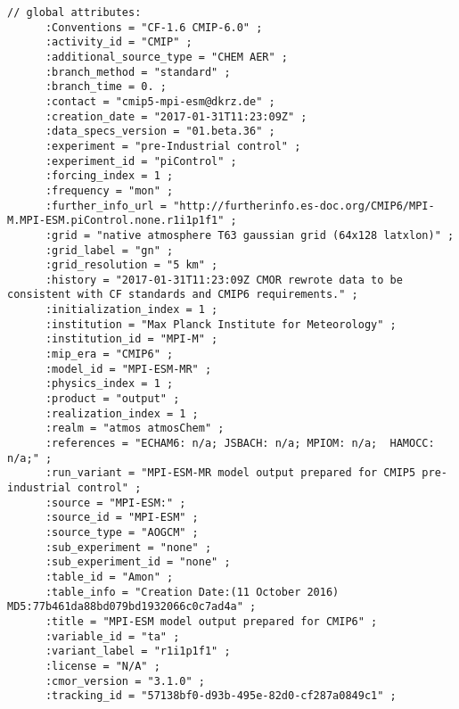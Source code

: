 \begin{lstlisting}[frame=single, backgroundcolor=\color{pcolor1}, basicstyle=\footnotesize]
// global attributes:
      :Conventions = "CF-1.6 CMIP-6.0" ;
      :activity_id = "CMIP" ;
      :additional_source_type = "CHEM AER" ;
      :branch_method = "standard" ;
      :branch_time = 0. ;
      :contact = "cmip5-mpi-esm@dkrz.de" ;
      :creation_date = "2017-01-31T11:23:09Z" ;
      :data_specs_version = "01.beta.36" ;
      :experiment = "pre-Industrial control" ;
      :experiment_id = "piControl" ;
      :forcing_index = 1 ;
      :frequency = "mon" ;
      :further_info_url = "http://furtherinfo.es-doc.org/CMIP6/MPI-M.MPI-ESM.piControl.none.r1i1p1f1" ;
      :grid = "native atmosphere T63 gaussian grid (64x128 latxlon)" ;
      :grid_label = "gn" ;
      :grid_resolution = "5 km" ;
      :history = "2017-01-31T11:23:09Z CMOR rewrote data to be consistent with CF standards and CMIP6 requirements." ;
      :initialization_index = 1 ;
      :institution = "Max Planck Institute for Meteorology" ;
      :institution_id = "MPI-M" ;
      :mip_era = "CMIP6" ;
      :model_id = "MPI-ESM-MR" ;
      :physics_index = 1 ;
      :product = "output" ;
      :realization_index = 1 ;
      :realm = "atmos atmosChem" ;
      :references = "ECHAM6: n/a; JSBACH: n/a; MPIOM: n/a;  HAMOCC: n/a;" ;
      :run_variant = "MPI-ESM-MR model output prepared for CMIP5 pre-industrial control" ;
      :source = "MPI-ESM:" ;
      :source_id = "MPI-ESM" ;
      :source_type = "AOGCM" ;
      :sub_experiment = "none" ;
      :sub_experiment_id = "none" ;
      :table_id = "Amon" ;
      :table_info = "Creation Date:(11 October 2016) MD5:77b461da88bd079bd1932066c0c7ad4a" ;
      :title = "MPI-ESM model output prepared for CMIP6" ;
      :variable_id = "ta" ;
      :variant_label = "r1i1p1f1" ;
      :license = "N/A" ;
      :cmor_version = "3.1.0" ;
      :tracking_id = "57138bf0-d93b-495e-82d0-cf287a0849c1" ;
\end{lstlisting}

